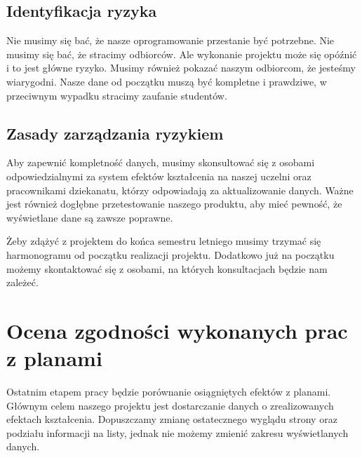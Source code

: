 \documentclass{article}
\begin{document}
\subsection{Identyfikacja ryzyka}
Nie musimy się bać, że nasze oprogramowanie przestanie być potrzebne. Nie musimy się bać, że stracimy odbiorców. Ale wykonanie projektu może się opóźnić i to jest główne ryzyko.
Musimy również pokazać naszym odbiorcom, że jesteśmy wiarygodni. Nasze dane od początku muszą być kompletne i prawdziwe, w przeciwnym wypadku stracimy zaufanie studentów.

\subsection{Zasady zarządzania ryzykiem}
Aby zapewnić kompletność danych, musimy skonsultować się z osobami odpowiedzialnymi za system efektów kształcenia na naszej uczelni oraz pracownikami dziekanatu, którzy odpowiadają za aktualizowanie danych.
Ważne jest również dogłębne przetestowanie naszego produktu, aby mieć pewność, że wyświetlane dane są zawsze poprawne.

Żeby zdążyć z projektem do końca semestru letniego musimy trzymać się harmonogramu od początku realizacji projektu. 
Dodatkowo już na początku możemy skontaktować się z osobami, na których konsultacjach będzie nam zależeć.


\section{Ocena zgodności wykonanych prac z planami}
Ostatnim etapem pracy będzie porównanie osiągniętych efektów z planami.
Głównym celem naszego projektu jest dostarczanie danych o zrealizowanych efektach kształcenia.
Dopuszczamy zmianę ostatecznego wyglądu strony oraz podziału informacji na listy, jednak nie możemy zmienić zakresu wyświetlanych danych.
\end{document}
